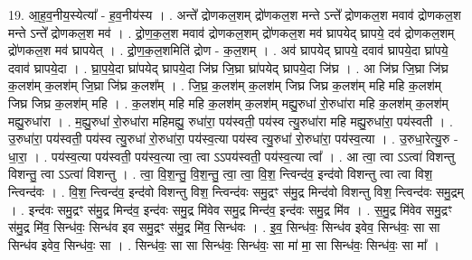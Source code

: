\documentclass[17pt]{extarticle}
\begin{document}
19. आ॒ह॒व॒नीय॒स्येत्या᳚ - ह॒व॒नीय॑स्य । . अन्ते᳚ द्रोणकल॒शम् द्रो॑णकल॒श मन्ते ऽन्ते᳚ द्रोणकल॒श मवाव॑ द्रोणकल॒श मन्ते ऽन्ते᳚ द्रोणकल॒श मव॑ । . द्रो॒ण॒क॒ल॒श मवाव॑ द्रोणकल॒शम् द्रो॑णकल॒श मव॑ घ्रापयेद् घ्रापये॒ दव॑ द्रोणकल॒शम् द्रो॑णकल॒श मव॑ घ्रापयेत् । . द्रो॒ण॒क॒ल॒शमिति॑ द्रोण - क॒ल॒शम् । . अव॑ घ्रापयेद् घ्रापये॒ दवाव॑ घ्रापये॒दा घ्रा॑पये॒ दवाव॑ घ्रापये॒दा । . घ्रा॒प॒ये॒दा घ्रा॑पयेद् घ्रापये॒दा जि॑घ्र जि॒घ्रा घ्रा॑पयेद् घ्रापये॒दा जि॑घ्र । . आ जि॑घ्र जि॒घ्रा जि॑घ्र क॒लश॑म् क॒लश॑म् जि॒घ्रा जि॑घ्र क॒लश᳚म् । . जि॒घ्र॒ क॒लश॑म् क॒लश॑म् जिघ्र जिघ्र क॒लश॑म् महि महि क॒लश॑म् जिघ्र जिघ्र क॒लश॑म् महि । . क॒लश॑म् महि महि क॒लश॑म् क॒लश॑म् मह्यु॒रुधा॑ रो॒रुधा॑रा महि क॒लश॑म् क॒लश॑म् मह्यु॒रुधा॑रा । . म॒ह्यु॒रुधा॑ रो॒रुधा॑रा महिमह्यु॒ रुधा॑रा॒ पय॑स्वती॒ पय॑स्व त्यु॒रुधा॑रा महि मह्यु॒रुधा॑रा॒ पय॑स्वती । . उ॒रुधा॑रा॒ पय॑स्वती॒ पय॑स्व त्यु॒रुधा॑ रो॒रुधा॑रा॒ पय॑स्व॒त्या पय॑स्व त्यु॒रुधा॑ रो॒रुधा॑रा॒ पय॑स्व॒त्या । . उ॒रुधा॒रेत्यु॒रु - धा॒रा॒ । . पय॑स्व॒त्या पय॑स्वती॒ पय॑स्व॒त्या त्वा॒ त्वा ऽऽपय॑स्वती॒ पय॑स्व॒त्या त्वा᳚ । . आ त्वा॒ त्वा ऽऽत्वा॑ विशन्तु विशन्तु॒ त्वा ऽऽत्वा॑ विशन्तु । . त्वा॒ वि॒श॒न्तु॒ वि॒श॒न्तु॒ त्वा॒ त्वा॒ वि॒श॒ न्त्विन्द॑व॒ इन्द॑वो विशन्तु त्वा त्वा विश॒ न्त्विन्द॑वः । . वि॒श॒ न्त्विन्द॑व॒ इन्द॑वो विशन्तु विश॒ न्त्विन्द॑वः समु॒द्रꣳ स॑मु॒द्र मिन्द॑वो विशन्तु विश॒ न्त्विन्द॑वः समु॒द्रम् । . इन्द॑वः समु॒द्रꣳ स॑मु॒द्र मिन्द॑व॒ इन्द॑वः समु॒द्र मि॑वेव समु॒द्र मिन्द॑व॒ इन्द॑वः समु॒द्र मि॑व । . स॒मु॒द्र मि॑वेव समु॒द्रꣳ स॑मु॒द्र मि॑व॒ सिन्ध॑वः॒ सिन्ध॑व इव समु॒द्रꣳ स॑मु॒द्र मि॑व॒ सिन्ध॑वः । . इ॒व॒ सिन्ध॑वः॒ सिन्ध॑व इवेव॒ सिन्ध॑वः॒ सा सा सिन्ध॑व इवेव॒ सिन्ध॑वः॒ सा । . सिन्ध॑वः॒ सा सा सिन्ध॑वः॒ सिन्ध॑वः॒ सा मा॑ मा॒ सा सिन्ध॑वः॒ सिन्ध॑वः॒ सा मा᳚ । \newline
\end{document}
